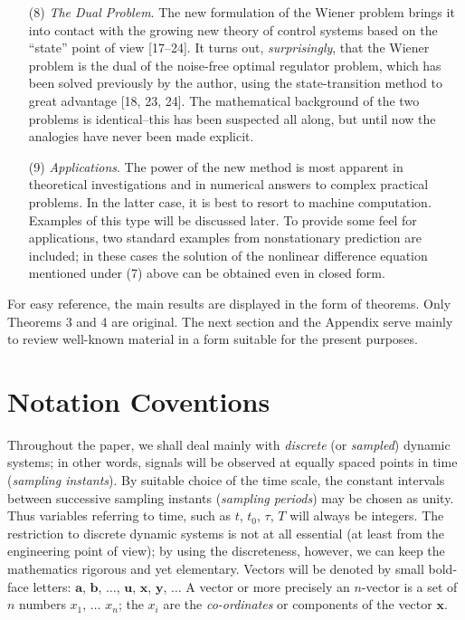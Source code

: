 \documentclass{article}
\begin{document}
\begin{itemize}
\item[(8)] \emph{The Dual Problem}. The new formulation of the Wiener problem brings it into contact with the growing new theory of control systems based on the “state” point of view [17--24]. It turns out, \emph{surprisingly}, that the Wiener problem is the dual of the noise-free optimal regulator problem, which has been solved previously by the author, using the state-transition method to great advantage [18, 23, 24]. The mathematical background of the two problems is identical--this has been suspected all along, but until now the analogies have never been made explicit.
\item[(9)] \emph{Applications}. The power of the new method is most apparent in theoretical investigations and in numerical answers to complex practical problems. In the latter case, it is best to resort to machine computation. Examples of this type will be discussed later. To provide some feel for applications, two standard examples from nonstationary prediction are included; in these cases the solution of the nonlinear difference equation mentioned under (7) above can be obtained even in closed form.
\end{itemize}

For easy reference, the main results are displayed in the form of theorems. Only Theorems 3 and 4 are original. The next section and the Appendix serve mainly to review well-known material in a form suitable for the present purposes.

\section{Notation Coventions}
Throughout the paper, we shall deal mainly with \emph{discrete} (or \emph{sampled}) dynamic systems; in other words, signals will be observed at equally spaced points in time (\emph{sampling instants}). By suitable choice of the time scale, the constant intervals between successive sampling instants (\emph{sampling periods}) may be chosen as unity. Thus variables referring to time, such as $t$, $t_0$, $\tau$, $T$ will always be integers. The restriction to discrete dynamic systems is not at all essential (at least from the engineering point of view); by using the discreteness, however, we can keep the mathematics rigorous and yet elementary. Vectors will be denoted by small bold-face letters: $\mathbf{a}$, $\mathbf{b}$, $\dotsc$, $\mathbf{u}$, $\mathbf{x}$, $\mathbf{y}$, $\dotsc$ A vector or more precisely an $n$-vector is a set of $n$ numbers $x_1$, $\dotsc$ $x_n$; the $x_i$ are the \emph{co-ordinates} or components of the vector $\mathbf{x}$.
\end{document}
